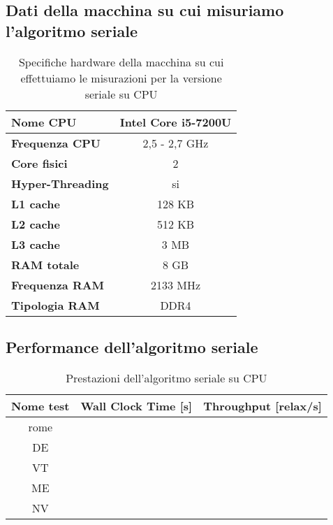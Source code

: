 \documentclass[a4paper]{article}
\begin{document}
	\subsection{Dati della macchina su cui misuriamo l'algoritmo seriale}
	\begin{table}[!ht]
		\centering
		\begin{tabular}{|l|c|}
			\hline
			\textbf{Nome CPU} & Intel Core i5-7200U \\ \hline
			\textbf{Frequenza CPU} & 2,5 - 2,7 GHz \\ \hline
			\textbf{Core fisici} & 2 \\ \hline
			\textbf{Hyper-Threading} & si \\ \hline
			\textbf{L1 cache} & 128 KB \\ \hline
			\textbf{L2 cache} & 512 KB \\ \hline
			\textbf{L3 cache} & 3 MB \\ \hline
			\textbf{RAM totale} & 8 GB \\ \hline
			\textbf{Frequenza RAM} & 2133 MHz \\ \hline
			\textbf{Tipologia RAM} & DDR4 \\ \hline
		\end{tabular}
		\label{tab:specs_serial_cpu}
		\caption{Specifiche hardware della macchina su cui effettuiamo le misurazioni per la versione seriale su CPU}
	\end{table}

	\subsection{Performance dell'algoritmo seriale}
	\begin{table}[!ht]
		\centering
		\begin{tabular}{|c|c|c|}
			\hline
			\textbf{Nome test} & \textbf{Wall Clock Time [s]} & \textbf{Throughput [relax/s]} \\ \hline
			       rome        &                          &                     \\ \hline
			        DE         &                          &                     \\ \hline
			        VT         &                          &                     \\ \hline
			        ME         &                          &                     \\ \hline
			        NV         &                          &                     \\ \hline
		\end{tabular}
		\label{tab:performance_serial}
		\caption{Prestazioni dell'algoritmo seriale su CPU}
	\end{table}
	
\end{document}
